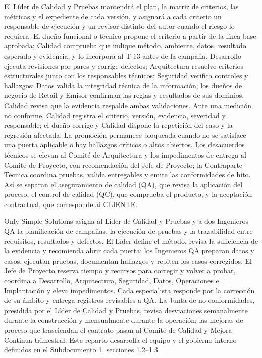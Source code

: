 \documentclass[11pt]{article}
\begin{document}
El Líder de Calidad y Pruebas mantendrá el plan, la matriz de criterios, las métricas y el expediente de cada versión, y asignará a cada criterio un responsable de ejecución y un revisor distinto del autor cuando el riesgo lo requiera. El dueño funcional o técnico propone el criterio a partir de la línea base aprobada; Calidad comprueba que indique método, ambiente, datos, resultado esperado y evidencia, y lo incorpora al T-13 antes de la campaña. Desarrollo ejecuta revisiones por pares y corrige defectos; Arquitectura resuelve criterios estructurales junto con los responsables técnicos; Seguridad verifica controles y hallazgos; Datos valida la integridad técnica de la información; los dueños de negocio de Retail y Emisor confirman las reglas y resultados de sus dominios. Calidad revisa que la evidencia respalde ambas validaciones. Ante una medición no conforme, Calidad registra el criterio, versión, evidencia, severidad y responsable; el dueño corrige y Calidad dispone la repetición del caso y la regresión afectada. La promoción permanece bloqueada cuando no se satisface una puerta aplicable o hay hallazgos críticos o altos abiertos. Los desacuerdos técnicos se elevan al Comité de Arquitectura y los impedimentos de entrega al Comité de Proyecto, con recomendación del Jefe de Proyecto; la Contraparte Técnica coordina pruebas, valida entregables y emite las conformidades de hito. Así se separan el aseguramiento de calidad (QA), que revisa la aplicación del proceso, el control de calidad (QC), que comprueba el producto, y la aceptación contractual, que corresponde al CLIENTE.

Only Simple Solutions asigna al Líder de Calidad y Pruebas y a dos Ingenieros QA la planificación de campañas, la ejecución de pruebas y la trazabilidad entre requisitos, resultados y defectos. El Líder define el método, revisa la suficiencia de la evidencia y recomienda abrir cada puerta; los Ingenieros QA preparan datos y casos, ejecutan pruebas, documentan hallazgos y repiten los casos corregidos. El Jefe de Proyecto reserva tiempo y recursos para corregir y volver a probar, coordina a Desarrollo, Arquitectura, Seguridad, Datos, Operaciones e Implantación y eleva impedimentos. Cada especialista responde por la corrección de su ámbito y entrega registros revisables a QA. La Junta de no conformidades, presidida por el Líder de Calidad y Pruebas, revisa desviaciones semanalmente durante la construcción y mensualmente durante la operación; las mejoras de proceso que trasciendan el contrato pasan al Comité de Calidad y Mejora Continua trimestral. Este reparto desarrolla el equipo y el gobierno interno definidos en el Subdocumento 1, secciones 1.2--1.3.
\end{document}
